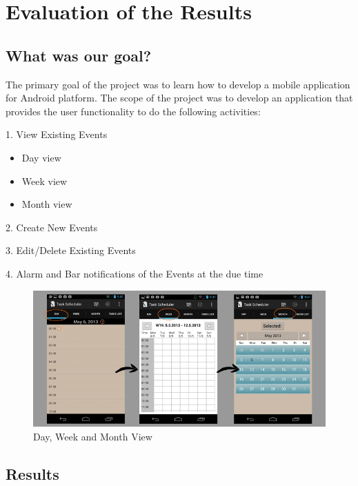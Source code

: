 \documentclass[10pt,a4paper]{report}
\begin{document}
 
\chapter{Evaluation of the Results}
\label{results}

\section{What was our goal?}
The primary goal of the project was to learn how to develop a mobile application for Android platform. The scope of the project was to develop an application that provides the user functionality to do the following activities:

\begin{description}
 \item 1. View Existing Events
  \begin{itemize}
    \item Day view
    \item Week view
    \item Month view
  \end{itemize}
  
  \item 2. Create New Events
  \item 3. Edit/Delete Existing Events
  \item 4. Alarm and Bar notifications of the Events at the due time
\end{description}

\begin{figure}[h!]
\begin{center}
\includegraphics[scale=.5]{daymonthweek.jpg}  
\end{center}
\caption{Day, Week and Month View}
\label{hd}
\end{figure}


\section{Results}
\label{sresults}
\end{document}

